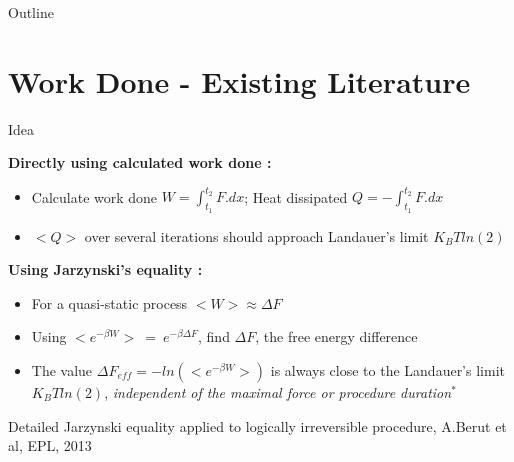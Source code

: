 \documentclass{beamer}
\begin{document}
\begin{frame}{Outline}
  \tableofcontents  %
\end{frame}
\section{Work Done - Existing Literature}
\begin{frame}{Idea}

\textbf{Directly using calculated work done :}
\begin{itemize}

\item Calculate work done $W = \int_{t_1}^{t_2} F .dx$; Heat dissipated $Q = -\int_{t_1}^{t_2} F .dx$
\item $<Q>$ over several iterations should approach Landauer's limit $K_BT ln(2)$ 

\end{itemize} 

\textbf{Using Jarzynski's equality :}
\begin{itemize}

\item For a quasi-static process $<W> \approx \Delta F $
\item Using $<e^{-\beta W}> ~=~ e^{-\beta \Delta F}$, find $\Delta F$, the free energy difference
\item The value $\Delta F_{eff}=-ln(<e^{-\beta W}>)$ is always close to the Landauer's limit $K_BT ln(2)$, \textit{independent of the maximal force or procedure duration}$^*$

\end{itemize} 
\tiny{Detailed Jarzynski equality applied to logically irreversible procedure, A.Berut et al, EPL, 2013}
\end{frame}
\end{document}
